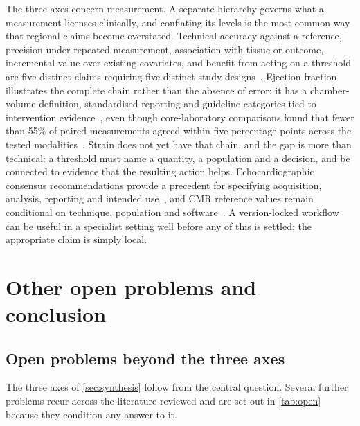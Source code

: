 The three axes concern measurement. A separate hierarchy governs what a measurement licenses
clinically, and conflating its levels is the most common way that regional claims become
overstated. Technical accuracy against a reference, precision under repeated measurement,
association with tissue or outcome, incremental value over existing covariates, and benefit from
acting on a threshold are five distinct claims requiring five distinct study
designs~\citep{raunig2015,fda2022qib,puntmann2018}. Ejection fraction illustrates the complete chain
rather than the absence of error: it has a chamber-volume definition, standardised reporting and
guideline categories tied to intervention evidence~\citep{schulzmenger2020,hundley2022,heidenreich2022},
even though core-laboratory comparisons found that fewer than 55\% of paired measurements agreed
within five percentage points across the tested modalities~\citep{pellikka2018}. Strain does not yet
have that chain, and the gap is more than technical: a threshold must name a quantity, a population
and a decision, and be connected to evidence that the resulting action helps. Echocardiographic
consensus recommendations provide a precedent for specifying acquisition, analysis, reporting and
intended use~\citep{thomas2025}, and CMR reference values remain conditional on technique,
population and software~\citep{kawelboehm2025}. A version-locked workflow can be useful in a
specialist setting well before any of this is settled; the appropriate claim is simply local.

\section{Other open problems and conclusion}\label{sec:open}

\subsection{Open problems beyond the three axes}\label{sec:otheropen}

The three axes of \cref{sec:synthesis} follow from the central question. Several further problems
recur across the literature reviewed and are set out in \cref{tab:open} because they condition any
answer to it.

